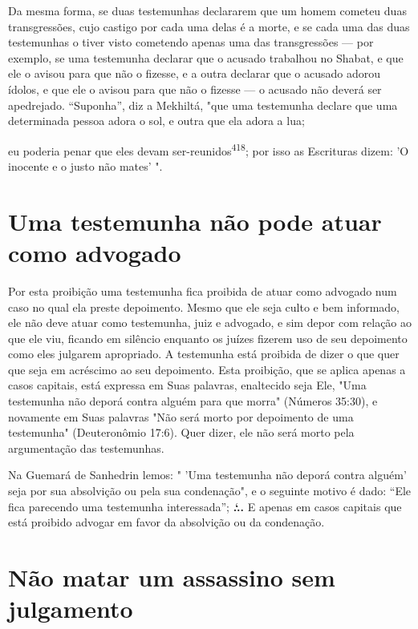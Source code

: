 Da mesma forma, se duas testemunhas declararem que um homem cometeu duas
transgressões, cujo castigo por cada uma delas é a morte, e se cada uma
das duas testemunhas o tiver visto cometendo apenas uma das
trans­gressões --- por exemplo, se uma testemunha declarar que o acusado
trabalhou no Shabat, e que ele o avisou para que não o fizesse, e a
outra declarar que o acusado adorou ídolos, e que ele o avisou para que
não o fizesse --- o acusado não deverá ser apedrejado. ``Suponha'', diz a
Mekhiltá, "que uma testemunha declare que uma determinada pessoa adora o
sol, e outra que ela adora a lua;

eu poderia penar que eles devam ser-reunidos\textsuperscript{418}; por
isso as Escrituras dizem: 'O inocente e o justo não mates' ".

\section{Uma testemunha não pode atuar como advogado}

Por esta proibição uma testemunha fica proibida de atuar como ad­vogado
num caso no qual ela preste depoimento. Mesmo que ele seja culto e bem
informado, ele não deve atuar como testemunha, juiz e advogado, e sim
depor com relação ao que ele viu, ficando em silêncio enquanto os juízes
fize­rem uso de seu depoimento como eles julgarem apropriado. A
testemunha está proibida de dizer o que quer que seja em acréscimo ao
seu depoimento. Esta proibição, que se aplica apenas a casos capitais,
está expressa em Suas palavras, enaltecido seja Ele, "Uma testemunha não
deporá contra alguém para que mor­ra" (Números 35:30), e novamente em
Suas palavras "Não será morto por de­poimento de uma testemunha"
(Deuteronômio 17:6). Quer dizer, ele não será morto pela argumentação
das testemunhas.

Na Guemará de Sanhedrin lemos: " 'Uma testemunha não deporá con­tra
alguém' seja por sua absolvição ou pela sua condenação", e o seguinte
moti­vo é dado: ``Ele fica parecendo uma testemunha interessada'';
\textbf{.`..} E apenas em casos
capitais que está proibido advogar em favor da absolvição ou da
condenação.

\section{Não matar um assassino sem julgamento}

